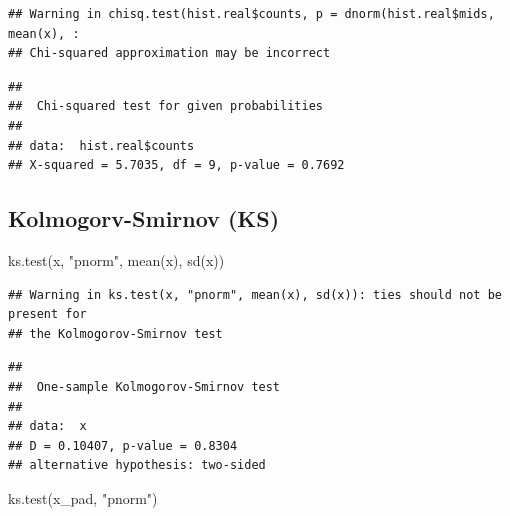 \documentclass[
]{article}
\newenvironment{Shaded}{\begin{snugshade}}{\end{snugshade}}
\newcommand{\AttributeTok}[1]{\textcolor[rgb]{0.77,0.63,0.00}{#1}}
\newcommand{\CommentTok}[1]{\textcolor[rgb]{0.56,0.35,0.01}{\textit{#1}}}
\newcommand{\ConstantTok}[1]{\textcolor[rgb]{0.00,0.00,0.00}{#1}}
\newcommand{\FunctionTok}[1]{\textcolor[rgb]{0.00,0.00,0.00}{#1}}
\newcommand{\NormalTok}[1]{#1}
\newcommand{\SpecialCharTok}[1]{\textcolor[rgb]{0.00,0.00,0.00}{#1}}
\newcommand{\StringTok}[1]{\textcolor[rgb]{0.31,0.60,0.02}{#1}}
\begin{document}
\begin{Shaded}
\end{Shaded}

\begin{verbatim}
## Warning in chisq.test(hist.real$counts, p = dnorm(hist.real$mids, mean(x), :
## Chi-squared approximation may be incorrect
\end{verbatim}

\begin{verbatim}
## 
##  Chi-squared test for given probabilities
## 
## data:  hist.real$counts
## X-squared = 5.7035, df = 9, p-value = 0.7692
\end{verbatim}

\hypertarget{kolmogorv-smirnov-ks}{%
\subsection{Kolmogorv-Smirnov (KS)}\label{kolmogorv-smirnov-ks}}

\begin{Shaded}
\begin{Highlighting}[]
\FunctionTok{ks.test}\NormalTok{(x, }\StringTok{"pnorm"}\NormalTok{, }\FunctionTok{mean}\NormalTok{(x), }\FunctionTok{sd}\NormalTok{(x))}
\end{Highlighting}
\end{Shaded}

\begin{verbatim}
## Warning in ks.test(x, "pnorm", mean(x), sd(x)): ties should not be present for
## the Kolmogorov-Smirnov test
\end{verbatim}

\begin{verbatim}
## 
##  One-sample Kolmogorov-Smirnov test
## 
## data:  x
## D = 0.10407, p-value = 0.8304
## alternative hypothesis: two-sided
\end{verbatim}

\begin{Shaded}
\begin{Highlighting}[]
\FunctionTok{ks.test}\NormalTok{(x\_pad, }\StringTok{"pnorm"}\NormalTok{)}
\end{Highlighting}
\end{Shaded}
\end{document}
